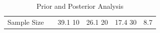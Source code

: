 \begin{table}
\caption{Prior and Posterior Analysis}
\label{tab:percent_helped}
\begin{tabular}{rll}
\toprule
Sample Size & %
 & 39.1%
10 & 26.1%
20 & 17.4%
30 & 8.7%
\bottomrule
\end{tabular}
\end{table}
